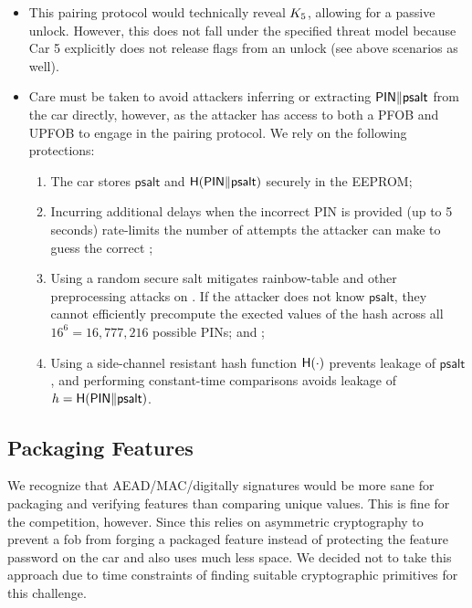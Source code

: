 \begin{itemize}
    \item This pairing protocol would technically reveal $K_5$, allowing for a passive unlock. However, this does not fall under the specified threat model because Car 5 explicitly does not release flags from an unlock (see above scenarios as well).
    \item Care must be taken to avoid attackers inferring or extracting $\mathsf{PIN} \Vert \mathsf{psalt}$ from the car directly, however, as the attacker has access to both a PFOB and UPFOB to engage in the pairing protocol. We rely on the following protections:
    \begin{enumerate}
        \item The car stores $\mathsf{psalt}$ and $\mathsf{H}(\mathsf{PIN} \Vert \mathsf{psalt})$ securely in the EEPROM;
        \item Incurring additional delays when the incorrect PIN is provided (up to 5 seconds) rate-limits the number of attempts the attacker can make to guess the correct \pin;
        \item Using a random secure salt mitigates rainbow-table and other preprocessing attacks on \pin. If the attacker does not know $\mathsf{psalt}$, they cannot efficiently precompute the exected values of the hash across all $16^6 = 16{,}777{,}216$ possible PINs; and ;
        \item Using a side-channel resistant hash function $\mathsf{H}(\cdot)$ prevents leakage of $\mathsf{psalt}$, and performing constant-time comparisons avoids leakage of $h = \mathsf{H}(\mathsf{PIN} \Vert \mathsf{psalt})$.
    \end{enumerate}
\end{itemize}

\subsection{Packaging Features}

We recognize that AEAD/MAC/digitally signatures would be more sane for packaging and verifying features than comparing unique values. This is fine for the competition, however. Since this relies on asymmetric cryptography to prevent a fob from forging a packaged feature instead of protecting the feature password on the car and also uses much less space. We decided not to take this approach due to time constraints of finding suitable cryptographic primitives for this challenge.

